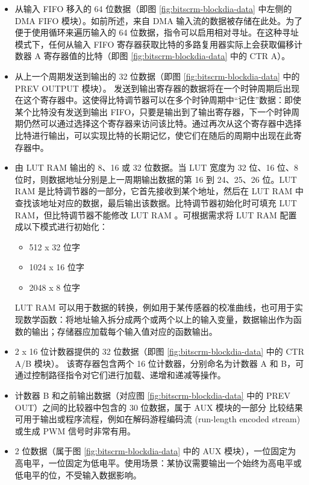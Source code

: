 \documentclass[main\_\_CN.tex]{subfiles}
\begin{document}
\begin{itemize}

\item 从输入 FIFO 移入的 64 位数据（即图 \ref{fig:bitscrm-blockdia-data} 中左侧的 DMA FIFO 模块）。如前所述，来自 DMA 输入流的数据被存储在此处。为了便于使用循环来遍历输入的 64 位数据，指令可以启用相对寻址。在这种寻址模式下，任何从输入 FIFO 寄存器获取比特的多路复用器实际上会获取偏移计数器 A 寄存器值的比特（即图 \ref{fig:bitscrm-blockdia-data} 中的 CTR A）。

\item 从上一个周期发送到输出的 32 位数据（即图 \ref{fig:bitscrm-blockdia-data} 中的 PREV OUTPUT 模块）。
发送到输出寄存器的数据将在一个时钟周期后出现在这个寄存器中。这使得比特调节器可以在多个时钟周期中“记住”数据：即使某个比特没有发送到输出 FIFO，只要是输出到了输出寄存器，下一个时钟周期仍然可以通过选择这个寄存器来访问该比特。通过再次从这个寄存器中选择比特进行输出，可以实现比特的长期记忆，使它们在随后的周期中出现在此寄存器中。

\item 由 LUT RAM 输出的 8、16 或 32 位数据。当 LUT 宽度为 32 位、16 位、8 位时，则数据地址分别是上一周期输出数据的第 16 到 24、25、26 位。LUT RAM 是比特调节器的一部分，它首先接收到某个地址，然后在 LUT RAM 中查找该地址对应的数据，最后输出该数据。比特调节器初始化时可填充 LUT RAM，但比特调节器不能修改 LUT RAM 。可根据需求将 LUT RAM 配置成以下模式进行初始化：

\begin{itemize}
    \item 512 x 32 位字
    \item 1024 x 16 位字
    \item 2048 x 8 位字

\end{itemize}

LUT RAM 可以用于数据的转换，例如用于某传感器的校准曲线，也可用于实现数学函数：将地址输入拆分成两个或两个以上的输入变量，数据输出作为函数的输出；存储器应加载每个输入值对应的函数输出。

\item 2 x 16 位计数器提供的 32 位数据（即图 \ref{fig:bitscrm-blockdia-data} 中的 CTR A/B 模块）。
该寄存器包含两个 16 位计数器，分别命名为计数器 A 和 B，可通过控制路径指令对它们进行加载、递增和递减等操作。

\item 计数器 B 和之前输出数据（对应图 \ref{fig:bitscrm-blockdia-data} 中的 PREV OUT）之间的比较器中包含的 30 位数据，属于 AUX 模块的一部分
比较结果可用于输出或程序流程，例如在解码游程编码流 (run-length encoded stream) 或生成 PWM 信号时非常有用。

\item 2 位数据（属于图 \ref{fig:bitscrm-blockdia-data} 中的 AUX 模块），一位固定为高电平，一位固定为低电平。使用场景：某协议需要输出一个始终为高电平或低电平的位，不受输入数据影响。

\end{itemize}
\end{document}
